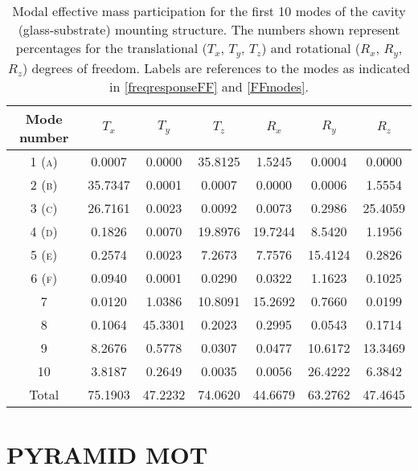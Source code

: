 \documentclass[../Thesis-IJspeert.tex]{subfiles}
\begin{document}
\begin{table}[h]
	\centering
	\begin{tabular}{ccccccc}
		\toprule
		{Mode number} & { ${T}_x$} & {${T}_y$} & {${T}_z$} & {${R}_x$} & {${R}_y$} & {${R}_z$} \\
		\midrule
		1 (\textsc{a}) & 0.0007 & 0.0000 & 35.8125 & 1.5245 & 0.0004 & 0.0000 \\
		2 (\textsc{b}) & 35.7347 & 0.0001 & 0.0007 & 0.0000 & 0.0006 & 1.5554 \\
		3 (\textsc{c}) & 26.7161 & 0.0023 & 0.0092 & 0.0073 & 0.2986 & 25.4059 \\
		4 (\textsc{d}) & 0.1826 & 0.0070 & 19.8976 & 19.7244 & 8.5420 & 1.1956 \\
		5 (\textsc{e}) & 0.2574 & 0.0023 & 7.2673 & 7.7576 & 15.4124 & 0.2826 \\
		6 (\textsc{f}) & 0.0940 & 0.0001 & 0.0290 & 0.0322 & 1.1623 & 0.1025 \\
		7 & 0.0120 & 1.0386 & 10.8091 & 15.2692 & 0.7660 & 0.0199 \\
		8 & 0.1064 & 45.3301 & 0.2023 & 0.2995 & 0.0543 & 0.1714 \\
		9 & 8.2676 & 0.5778 & 0.0307 & 0.0477 & 10.6172 & 13.3469 \\
		10 & 3.8187 & 0.2649 & 0.0035 & 0.0056 & 26.4222 & 6.3842 \\
		\midrule
		{Total} & 75.1903 & 47.2232 & 74.0620 & 44.6679 & 63.2762 & 47.4645 \\
		\bottomrule
	\end{tabular}
\caption[Percentages of modal effective mass for cavity (glass-substrate) mounting structure]{Modal effective mass participation for the first 10 modes of the cavity (glass-substrate) mounting structure. The numbers shown represent percentages for the translational (${T}_x$, ${T}_y$, ${T}_z$) and rotational (${R}_x$, ${R}_y$, ${R}_z$) degrees of freedom. Labels are references to the modes as indicated in \autoref{freqresponseFF} and \autoref{FFmodes}.}
	\label{tab:modepercentFinalfinger}   
\end{table}







\section{PYRAMID MOT}
\end{document}
